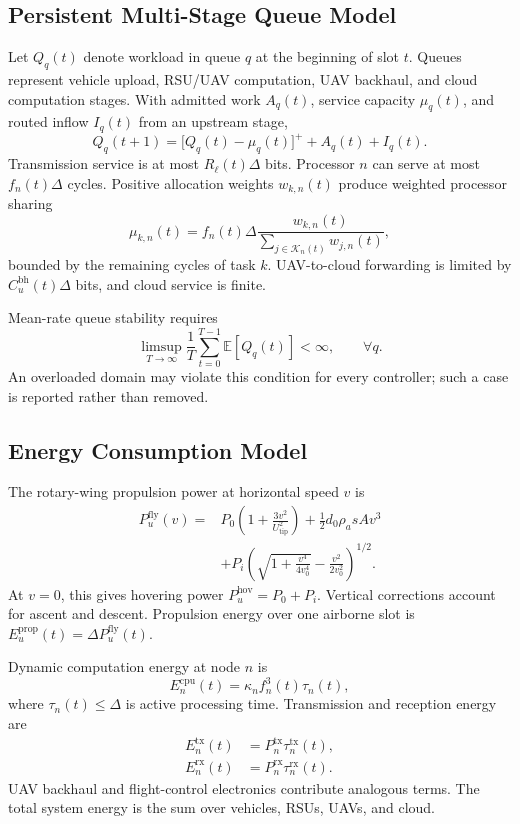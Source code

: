 \documentclass[journal]{IEEEtran}
\newcommand{\E}{\mathbb{E}}
\begin{document}
\subsection{Persistent Multi-Stage Queue Model}
Let $Q_q(t)$ denote workload in queue $q$ at the beginning of slot $t$.
Queues represent vehicle upload, RSU/UAV computation, UAV backhaul, and cloud
computation stages. With admitted work $A_q(t)$, service capacity $\mu_q(t)$,
and routed inflow $I_q(t)$ from an upstream stage,
\begin{equation}
Q_q(t+1)=\big[Q_q(t)-\mu_q(t)\big]^+ + A_q(t)+I_q(t).
\label{eq:queue}
\end{equation}
Transmission service is at most $R_\ell(t)\Delta$ bits. Processor $n$ can
serve at most $f_n(t)\Delta$ cycles. Positive allocation weights $w_{k,n}(t)$
produce weighted processor sharing
\begin{equation}
\mu_{k,n}(t)=f_n(t)\Delta
\frac{w_{k,n}(t)}{\sum_{j\in\mathcal K_n(t)}w_{j,n}(t)},
\end{equation}
bounded by the remaining cycles of task $k$. UAV-to-cloud forwarding is
limited by $C_u^{\mathrm{bh}}(t)\Delta$ bits, and cloud service is finite.

Mean-rate queue stability requires
\begin{equation}
\limsup_{T\to\infty}\frac{1}{T}\sum_{t=0}^{T-1}
\E[Q_q(t)]<\infty,\qquad \forall q.
\end{equation}
An overloaded domain may violate this condition for every controller; such a
case is reported rather than removed.

\subsection{Energy Consumption Model}
The rotary-wing propulsion power at horizontal speed $v$ is
\begin{align}
P_u^{\mathrm{fly}}(v)=&P_0\left(1+\frac{3v^2}{U_{\mathrm{tip}}^2}\right)
+\frac{1}{2}d_0\rho_a sA v^3\nonumber\\
&+P_i\left(\sqrt{1+\frac{v^4}{4v_0^4}}
-\frac{v^2}{2v_0^2}\right)^{1/2}.
\end{align}
At $v=0$, this gives hovering power $P_u^{\mathrm{hov}}=P_0+P_i$.
Vertical corrections account for ascent and descent. Propulsion energy over
one airborne slot is $E_u^{\mathrm{prop}}(t)=\Delta P_u^{\mathrm{fly}}(t)$.

Dynamic computation energy at node $n$ is
\begin{equation}
E_n^{\mathrm{cpu}}(t)=\kappa_n f_n^3(t)\tau_n(t),
\end{equation}
where $\tau_n(t)\le\Delta$ is active processing time. Transmission and
reception energy are
\begin{align}
E_n^{\mathrm{tx}}(t)&=P_n^{\mathrm{tx}}\tau_n^{\mathrm{tx}}(t),\\
E_n^{\mathrm{rx}}(t)&=P_n^{\mathrm{rx}}\tau_n^{\mathrm{rx}}(t).
\end{align}
UAV backhaul and flight-control electronics contribute analogous terms. The
total system energy is the sum over vehicles, RSUs, UAVs, and cloud.
\end{document}
